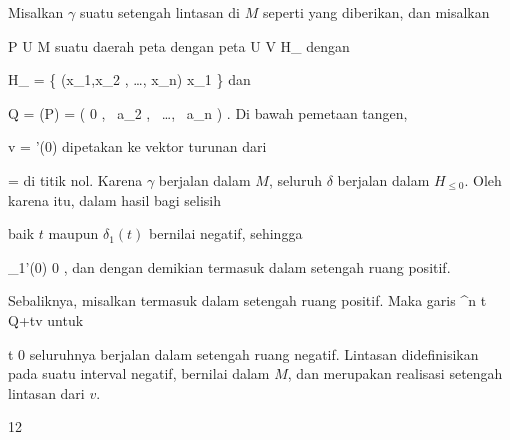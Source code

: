 {

Misalkan $\gamma$ suatu setengah lintasan di $M$ seperti yang diberikan, dan misalkan

\mavergleichskette
{\vergleichskette
{ P
}
{ \in }{  U
}
{ \subseteq }{ M
}
{    }{
}
{   }{
}
}
{}{}{}
suatu daerah peta dengan peta
\maabbdisp {\alpha} { U } {V \subseteq  H_{}
} {}
dengan

\mavergleichskettedisp
{\vergleichskette
{  H_{}
}
{ =} { \left\{ (x_1,x_2 , \ldots, x_n)  \mid   x_1         \right\}
}
{ } {
}
{ } {
}
{ } {
}
}
{}{}{}
dan

\mavergleichskettedisp
{\vergleichskette
{ Q
}
{ =} { \alpha(P)
}
{ =} { \left(  0   , \,  a_2  , \,   \ldots , \,  a_n                \right)
}
{ } {
}
{ } {
}
}
{}{}{.}
Di bawah pemetaan tangen,

\mavergleichskette
{\vergleichskette
{ v
}
{ = }{ \gamma'(0)
}
{  }{
}
{    }{
}
{   }{
}
}
{}{}{}
dipetakan ke vektor turunan dari

\mavergleichskette
{\vergleichskette
{ \delta
}
{ = }{ \alpha \circ \gamma
}
{  }{
}
{    }{
}
{   }{
}
}
{}{}{}
di titik nol. Karena $\gamma$ berjalan dalam $M$, seluruh $\delta$ berjalan dalam $H_{\leq 0}$. Oleh karena itu, dalam hasil bagi selisih

 {  }

baik $t$ maupun $\delta_1(t)$ bernilai negatif, sehingga

\mavergleichskettedisp
{\vergleichskette
{  \delta_1'(0)
}
{ \geq} { 0
}
{ } {
}
{ } {
}
{ } {
}
}
{}{}{,}
dan dengan demikian termasuk dalam setengah ruang positif.

Sebaliknya, misalkan
 termasuk dalam setengah ruang positif. Maka garis
\maabbeledisp {\delta} {\R} {\R^n
} { t } { Q+tv
} {}
untuk

\mavergleichskette
{\vergleichskette
{ t
}
{ \leq }{  0
}
{  }{
}
{    }{
}
{   }{
}
}
{}{}{}
seluruhnya berjalan dalam setengah ruang negatif. Lintasan
 didefinisikan pada suatu interval negatif, bernilai dalam $M$, dan merupakan realisasi setengah lintasan dari $v$.

}



{12}

